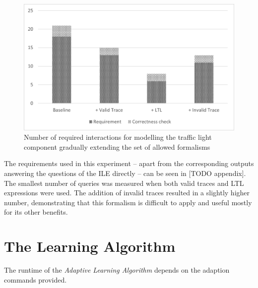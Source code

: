 \begin{figure}[H] 
	\centering
	\includegraphics[width=130mm, keepaspectratio]{figures/evaluation_trafficlightformalism.png}
	\caption{Number of required interactions for modelling the traffic light component gradually extending the set of allowed formalisms} 
	\label{fig_eval_trafficlightformalisms}
\end{figure}

The requirements used in this experiment -- apart from the corresponding outputs answering the questions of the ILE directly -- can be seen in [TODO appendix]. The smallest number of queries was measured when both valid traces and LTL expressions were used. The addition of invalid traces resulted in a slightly higher number, demonstrating that this formalism is difficult to apply and useful mostly for its other benefits.  
 
\section{The Learning Algorithm} \label{subs_evallearningalgo}
The runtime of the \textit{Adaptive Learning Algorithm} depends on the adaption commands provided. 

